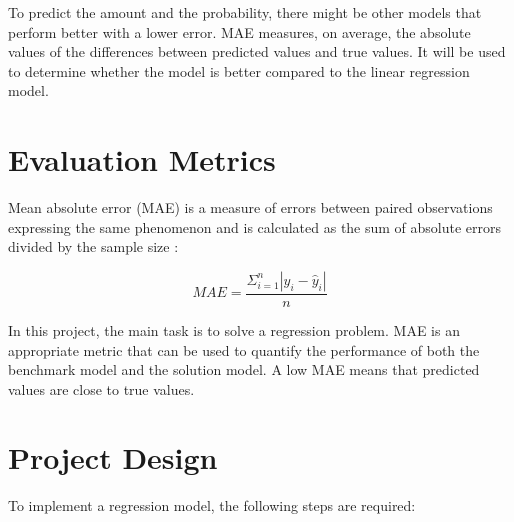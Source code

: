 \documentclass[a4paper,12pt]{article}
\begin{document}
To predict the amount and the probability, there might be other models that perform better with a lower error. MAE measures,  
on average, the absolute values of the differences between predicted values and true values. It will be used to determine 
whether the model is better compared to the linear regression model.

\section{Evaluation Metrics}

Mean absolute error (MAE) is a measure of errors between paired observations expressing the same phenomenon and is calculated 
as the sum of absolute errors divided by the sample size \cite{MAE}:

\begin{equation}
    MAE = \frac{\Sigma_{i=1}^{n}|y_{i} - \hat{y}_{i}|}{n}
\end{equation}

In this project, the main task is to solve a regression problem. MAE is an appropriate metric that can be used to quantify the 
performance of both the benchmark model and the solution model. A low MAE means that predicted values are close to true values.

\section{Project Design}

To implement a regression model, the following steps are required:
\end{document}
